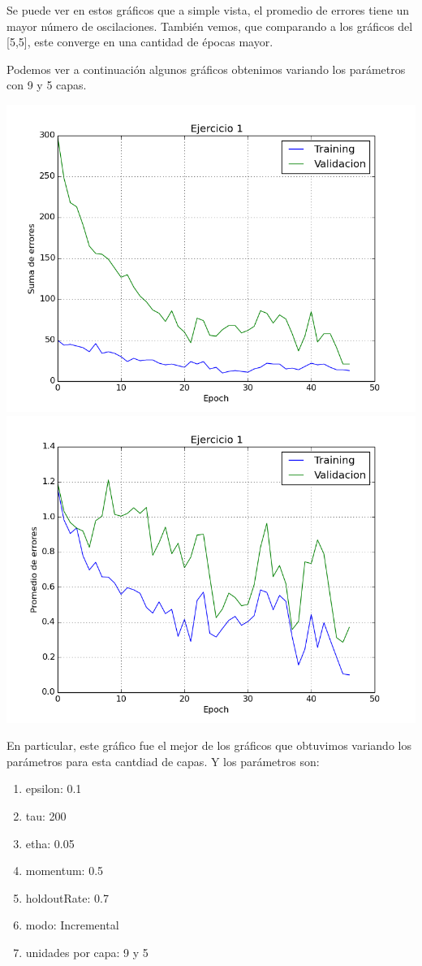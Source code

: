 Se puede ver en estos gráficos que a simple vista, el promedio de errores tiene un mayor número de oscilaciones. También vemos, que comparando a los gráficos del [5,5], este converge en una cantidad de épocas mayor.

\newpage 

Podemos ver a continuación algunos gráficos obtenimos variando los parámetros con 9 y 5 capas.

\includegraphics[scale=0.4]{img/ej100505195sum}
\includegraphics[scale=0.4]{img/ej100505195mean}

En particular, este gráfico fue el mejor de los gráficos que obtuvimos variando los parámetros para esta cantdiad de capas. Y los parámetros son:
\begin{enumerate}
\item epsilon: 0.1
\item tau: 200
\item etha: 0.05
\item momentum: 0.5
\item holdoutRate: 0.7
\item modo: Incremental
\item unidades por capa: 9 y 5
\end{enumerate}

